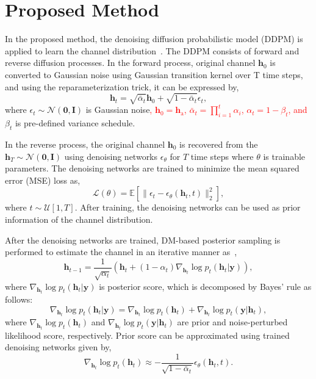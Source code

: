 \documentclass[lettersize,journal]{IEEEtran}
\newcommand{\tred}{\textcolor{red}}
\begin{document}
\section{Proposed Method}

In the proposed method, the denoising diffusion probabilistic model (DDPM) is applied to learn the channel distribution~\cite{hoDenoisingDiffusionProbabilistic2020}. The DDPM consists of forward and reverse diffusion processes. In the forward process, original channel $\mathbf{h}_{0}$ is converted to Gaussian noise using Gaussian transition kernel over T time steps, and using the reparameterization trick, it can be expressed by,
\begin{equation}
\mathbf{h}_{t} = \sqrt{ \bar{\alpha}_{t} }\mathbf{h}_{0} + \sqrt{ 1-\bar{\alpha}_{t} }\epsilon_{t},
\end{equation}
where $\epsilon_{t}\sim\mathcal{N}(\mathbf{0},\mathbf{I})$ is Gaussian noise\tred{, $\mathbf{h}_{0} = \mathbf{h}_{\text{a}}$, $\bar{\alpha}_{t}=\prod_{i=1}^{t}\alpha_{i}$, $\alpha_{t}=1-\beta_{t}$, and} $\beta_{t}$ is pre-defined variance schedule. 

In the reverse process, the original channel $\mathbf{h}_{0}$ is recovered from the $\mathbf{h}_{T}\sim\mathcal{N}(\mathbf{0},\mathbf{I})$ using denoising networks $\epsilon_{\theta}$ for $T$ time steps where $\theta$ is trainable parameters. The denoising networks are trained to minimize the mean squared error (MSE) loss as,
\begin{equation}
\mathcal{L}(\theta) = \mathbb{E}[\|\epsilon_{t} - \epsilon_{\theta}(\mathbf{h}_{t},t)\|_{2}^{2}],
\end{equation}
where $t\sim\mathcal{U}[1,T]$. After training, the denoising networks can be used as prior information of the channel distribution.

After the denoising networks are trained, DM-based posterior sampling is performed to estimate the channel in an iterative manner as~\cite{zhouGenerativeDiffusionModels2025},
\begin{equation}
\mathbf{h}_{t-1} = \frac{1}{\sqrt{ \alpha_{t} }}(\mathbf{h}_{t}+(1-\alpha_{t})\nabla_{\mathbf{h}_{t}}\log p_{t}(\mathbf{h}_{t}|\mathbf{y})),
\end{equation}
where $\nabla_{\mathbf{h}_{t}}\log p_{t}(\mathbf{h}_{t}|\mathbf{y})$ is posterior score, which is decomposed by Bayes' rule as follows:
\begin{equation}
\nabla_{\mathbf{h}_{t}}\log p_{t}(\mathbf{h}_{t}|\mathbf{y}) = \nabla_{\mathbf{h}_{t}}\log p_{t}(\mathbf{h}_{t})+\nabla_{\mathbf{h}_{t}}\log p_{t}(\mathbf{y}|\mathbf{h}_{t}),
\end{equation}
where $\nabla_{\mathbf{h}_{t}}\log p_{t}(\mathbf{h}_{t})$ and $\nabla_{\mathbf{h}_{t}}\log p_{t}(\mathbf{y}|\mathbf{h}_{t})$ are prior and noise-perturbed likelihood score, respectively.
Prior score can be approximated using trained denoising networks given by,
\begin{equation}
\nabla_{\mathbf{h}_{t}}\log p_{t}(\mathbf{h}_{t})\approx -\frac{1}{\sqrt{ 1-\bar{\alpha}_{t} }}\epsilon_{\theta}(\mathbf{h}_{t},t).
\end{equation}
\end{document}
